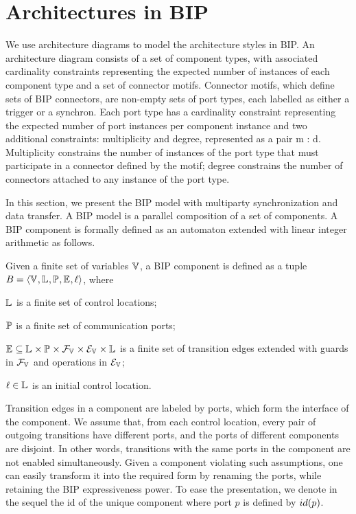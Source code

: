 \section{Architectures in BIP}
\label{sec:rsd}


We use architecture diagrams \cite{} to model the architecture styles in BIP.
An architecture diagram consists of a set of component types, with associated cardinality constraints representing the
expected number of instances of each component type and a set of connector motifs.
Connector motifs, which define sets of BIP connectors, are non-empty sets of port types, each labelled as either a trigger or a synchron.
Each port type has a cardinality constraint representing the expected number of port instances
per component instance and two additional constraints: multiplicity and degree,
represented as a pair m : d. Multiplicity constrains the number of instances of
the port type that must participate in a connector defined by the motif; degree
constrains the number of connectors attached to any instance of the port type.


In this section, we present the BIP model with multiparty synchronization and data transfer.
%
%
A BIP model is a parallel composition of a set of components.
A BIP component is formally defined as an automaton extended with linear integer arithmetic as follows.

\begin{definition} 
\label{component-def}
Given a finite set of variables $\mathbb{V}_{}$, a BIP component is defined as a tuple
 $B_{} = \langle{\ensuremath{\mathbb{V}_{}}, \ensuremath{\mathbb{L}_{}}, \ensuremath{\mathbb{P}_{}}, \ensuremath{\mathbb{E}_{}}, \ell}\rangle$, where
\begin{inparaenum}
\item $\mathbb{L}_{}$ is a finite set of control locations;
\item $\mathbb{P}_{}$ is a finite set of communication ports;
\item $\mathbb{E}_{} \subseteq \mathbb{L}_{} \times \mathbb{P}_{} \times \mathcal{F}_{\mathbb{V}_{}} \times \mathcal{E}_{\mathbb{V}_{}} \times \mathbb{L}_{}$
 is a finite set of transition edges extended with guards in $\mathcal{F}_{\mathbb{V}_{}}$
 and operations in $\mathcal{E}_{\mathbb{V}_{}}$;
\item $\ell \in \mathbb{L}_{}$ is an initial control location.
\end{inparaenum}
\end{definition}


Transition edges in a component are labeled by ports, which form the interface of the component.
 We assume that, from each control location,
 every pair of outgoing transitions have different ports,
 and the ports of different components are disjoint.
 In other words, transitions with the same ports in the component are not enabled simultaneously.
 Given a component violating such assumptions,
 one can easily transform it into the required form by renaming the ports,
 while retaining the BIP expressiveness power.
 To ease the presentation, we denote in the sequel the id of the unique component
 where port $p$ is defined by ${id({p})}$.

